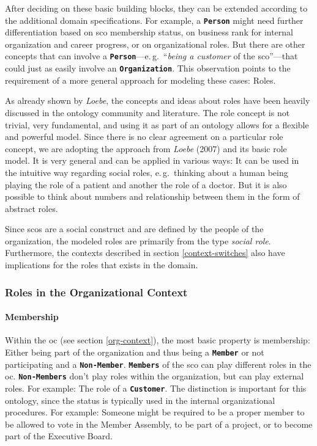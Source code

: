 \documentclass[a4paper, DIV=13, BCOR=0cm]{scrbook}
\newcommand{\eg}{e.\,g.\ }
\newcommand{\class}[1]{\texttt{\textbf{#1}}}
\begin{document}
After deciding on these basic building blocks, they can be extended according to the additional domain specifications. For example, a \class{Person} might need further differentiation based on \gls{sco} membership status, on business rank for internal organization and career progress, or on organizational roles. But there are other concepts that can involve a \class{Person}---\eg \enquote{\textit{being a customer} of the \gls{sco}}---that could just as easily involve an \class{Organization}. This observation points to the requirement of a more general approach for modeling these cases: Roles.

As already shown by \textit{Loebe}, the concepts and ideas about roles have been heavily discussed in the ontology community and literature. \cite[p.\,130~1.2]{loebe2007abstract} The role concept is not trivial, very fundamental, and using it as part of an ontology allows for a flexible and powerful model.
Since there is no clear agreement on a particular role concept, we are adopting the approach from \textit{Loebe} (2007) and its basic role model. It is very general and can be applied in various ways: It can be used in the intuitive way regarding social roles, \eg thinking about a human being playing the role of a patient and another the role of a doctor. But it is also possible to think about numbers and relationship between them in the form of abstract roles. \cite[p.\,131--133]{loebe2007abstract}

Since \glspl{sco} are a social construct and are defined by the people of the organization, the modeled roles are primarily from the type \textit{social role}. Furthermore, the contexts described in section \ref{context-switches} also have implications for the roles that exists in the domain.

\subsubsection{Roles in the Organizational Context }

\paragraph{Membership}
\label{membership}
Within the \gls{oc} (see section \ref{org-context}), the most basic property is membership: Either being part of the organization and thus being a \class{Member} or not participating and a \class{Non-Member}. \class{Members} of the \gls{sco} can play different roles in the \gls{oc}. \class{Non-Members} don't play roles within the organization, but can play external roles. For example: The role of a \class{Customer}. The distinction is important for this ontology, since the status is typically used in the internal organizational procedures. For example: Someone might be required to be a proper member to be allowed to vote in the Member Assembly, to be part of a project, or to become part of the Executive Board.
\end{document}
